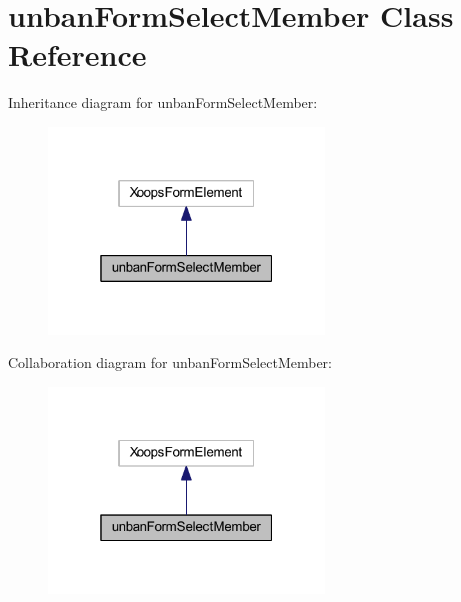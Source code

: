 \hypertarget{classunban_form_select_member}{\section{unban\-Form\-Select\-Member Class Reference}
\label{classunban_form_select_member}
}


Inheritance diagram for unban\-Form\-Select\-Member\-:
\nopagebreak
\begin{figure}[H]
\begin{center}
\leavevmode
\includegraphics[width=208pt]{classunban_form_select_member__inherit__graph}
\end{center}
\end{figure}


Collaboration diagram for unban\-Form\-Select\-Member\-:
\nopagebreak
\begin{figure}[H]
\begin{center}
\leavevmode
\includegraphics[width=208pt]{classunban_form_select_member__coll__graph}
\end{center}
\end{figure}
